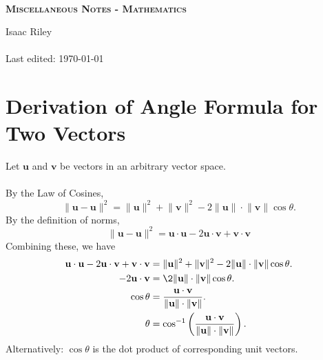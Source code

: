 \documentclass[a4, 12pt]{article}
\newcommand{\vecv}{\textbf{v}}
\newcommand{\vecu}{\textbf{u}}
\begin{document}
\begin{titlepage}


\thispagestyle{fancy}

\vphantom{x}

\vspace{0.5in}

\center


\textsc{\large }

\vspace{0.5in}

\noindent\makebox[\linewidth]{\rule{\linewidth}{1.2pt}}\\
\vspace{2mm}
\textsc{ \textbf{\large Miscellaneous Notes - Mathematics }}
\noindent\makebox[\linewidth]{\rule{\linewidth}{1.2pt}}

\vspace{2.5in}
Isaac Riley\\~\\

Last edited: \today

\end{titlepage}

\newpage

\setcounter{page}{2}
\tableofcontents
\newpage
\section{Derivation of Angle Formula for Two Vectors}
Let $\vecu$ and $\vecv$ be vectors in an arbitrary vector space. \\~\\
By the Law of Cosines, $$\lVert\vecu - \vecu\rVert^2 = \lVert\vecu\rVert^2+\lVert\vecv\rVert^2-2\lVert\vecu\rVert\cdot\lVert\vecv\rVert\cos \theta.$$
By the definition of norms, $$\lVert\vecu - \vecu\rVert^2 = \vecu \cdot \vecu - 2 \vecu \cdot \vecv + \vecv \cdot \vecv$$
Combining these, we have
\begin{align*}
\vecu \cdot \vecu - 2 \vecu \cdot \vecv + \vecv \cdot \vecv &= \lVert\vecu\rVert^2+\lVert\vecv\rVert^2-2\lVert\vecu\rVert\cdot\lVert\vecv\rVert\cos \theta.\\
-2\vecu \cdot \vecv &= \2 \lVert\vecu\rVert \cdot \lVert\vecv\rVert \cos \theta.\\
\cos \theta &= \dfrac{\vecu \cdot \vecv}{\lVert\vecu\rVert \cdot \lVert\vecv\rVert}.\\
\theta &=
\cos^{-1}
\left(
\dfrac{\vecu \cdot \vecv}{\lVert \vecu \rVert \cdot \lVert \vecv \rVert}
\right).
\end{align*}
Alternatively: $\cos \theta$ is the dot product of corresponding unit vectors.
\end{document}
